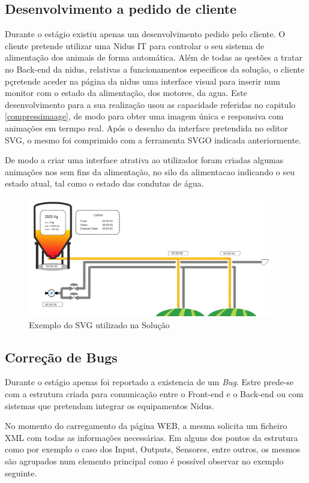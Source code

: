 \subsection{Desenvolvimento a pedido de cliente}

\par Durante o estágio existiu apenas um desenvolvimento pedido pelo cliente. O cliente pretende utilizar uma Nidus IT para controlar o seu sistema de alimentação dos animais de forma automática. Além de todas as qestões a tratar no Back-end da nidus, relativas a funcionamentos especificos da solução, o cliente pçretende aceder na página da nidus uma interface visual para inserir num monitor com o estado da alimentação, dos motores, da agua. Este desenvolvimento para a sua realização usou as capacidade referidas no capitulo \ref{compressimaage}, de modo para obter uma imagem única e responsiva com animações em termpo real. Após o desenho da interface pretendida no editor SVG, o mesmo foi comprimido com a ferramenta SVGO indicada anteriormente. \par De modo a criar uma interface atrativa ao utilizador foram criadas algumas animações nos sem fins da alimentação, no silo da alimentacao indicando o seu estado atual, tal como o estado das condutas de água.

 \begin{figure}[ht]
\centering
\includegraphics[width=0.95\textwidth]{images/svgpig.png}
\caption{Exemplo do SVG utilizado na Solução}\label{pig}
\end{figure}

\subsection{Correção de Bugs}

\par Durante o estágio apenas foi reportado a existencia de um \textit{Bug}. Estre prede-se com a estrutura criada para comunicação entre o Front-end e o Back-end ou com sistemas que pretendam integrar os equipamentos Nidus.
\par No momento do carregamento da página WEB, a mesma solicita um ficheiro XML com todas as informações necessárias. Em alguns dos pontos da estrutura como por exemplo o caso dos Input, Outputs, Sensores, entre outros, os mesmos são agrupados num elemento principal como é possível observar no exemplo seguinte.

